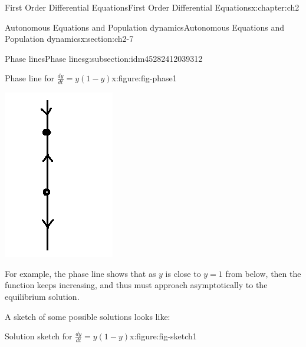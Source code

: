 \documentclass[oneside,10pt,]{book}
\numberwithin{equation}{section}
\numberwithin{equation}{section}
\begin{document}
\begin{chapterptx}{First Order Differential Equations}{}{First Order Differential Equations}{}{}{x:chapter:ch2}
\begin{sectionptx}{Autonomous Equations and Population dynamics}{}{Autonomous Equations and Population dynamics}{}{}{x:section:ch2-7}
\begin{subsectionptx}{Phase lines}{}{Phase lines}{}{}{g:subsection:idm45282412039312}
\begin{figureptx}{Phase line for \(\frac{dy}{dt} = y(1-y)\)}{x:figure:fig-phase1}{}
\begin{image}{0.35}{0.3}{0.35}
\includegraphics[width=\linewidth]{images/1.6-Phase1.png}
\end{image}%
\tcblower
\end{figureptx}%
For example, the phase line shows that as \(y\) is close to \(y=1\) from below, then the function keeps increasing, and thus must approach asymptotically to the equilibrium solution.%
\par
A sketch of some possible solutions looks like: \begin{figureptx}{Solution sketch for \(\frac{dy}{dt} = y(1-y)\)}{x:figure:fig-sketch1}{}%
\begin{image}{0.3}{0.4}{0.3}%

\end{image}
\end{figureptx}
\end{subsectionptx}
\end{sectionptx}
\end{chapterptx}
\end{document}
